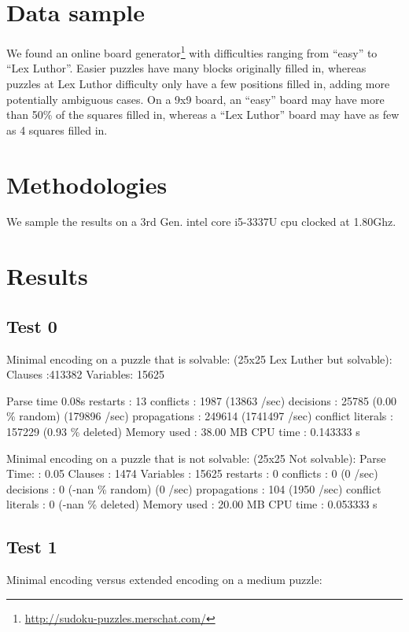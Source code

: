 \documentclass[conference,final]{IEEEtran}
\begin{document}
\section{Data sample}
We found an online board
generator\footnote{\url{http://sudoku-puzzles.merschat.com/}} with difficulties
ranging from ``easy'' to ``Lex Luthor''. Easier puzzles have many blocks
originally filled in, whereas puzzles at Lex Luthor difficulty only have a few
positions filled in, adding more potentially ambiguous cases. On a 9x9 board,
an ``easy'' board may have more than 50\% of the squares filled in, whereas a
``Lex Luthor'' board may have as few as 4 squares filled in.

\section{Methodologies}
We sample the results on a 3rd Gen. intel core i5-3337U cpu clocked at 1.80Ghz.

\section{Results}

\subsection{Test 0}
Minimal encoding on a puzzle that is solvable:
(25x25 Lex Luther but solvable):
Clauses  :413382
Variables: 15625

Parse time 0.08s
restarts              : 13
conflicts             : 1987           (13863 /sec)
decisions             : 25785          (0.00 \% random) (179896 /sec)
propagations          : 249614         (1741497 /sec)
conflict literals     : 157229         (0.93 \% deleted)
Memory used           : 38.00 MB
CPU time              : 0.143333 s

Minimal encoding on a puzzle that is not solvable:
(25x25 Not solvable):
Parse Time:		: 0.05
Clauses		      : 1474 
Variables	      : 15625
restarts              : 0
conflicts             : 0              (0 /sec)
decisions             : 0              (-nan \% random) (0 /sec)
propagations          : 104            (1950 /sec)
conflict literals     : 0              (-nan \% deleted)
Memory used           : 20.00 MB
CPU time              : 0.053333 s

\subsection{Test 1}
Minimal encoding versus extended encoding on a medium puzzle:
\end{document}
